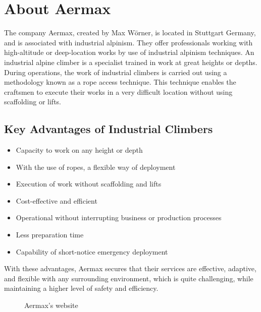 \section{About Aermax}

The company Aermax, created by Max Wörner, is located in Stuttgart Germany, and is associated with industrial alpinism. They offer professionals working with high-altitude or deep-location works by use of industrial alpinism techniques. An industrial alpine climber is a specialist trained in work at great heights or depths. During operations, the work of industrial climbers is carried out using a methodology known as a rope access technique. This technique enables the craftsmen to execute their works in a very difficult location without using scaffolding or lifts.


\subsection*{Key Advantages of Industrial Climbers}
\begin{itemize}
  \item Capacity to work on any height or depth
  \item With the use of ropes, a flexible way of deployment
  \item Execution of work without scaffolding and lifts
  \item Cost-effective and efficient
  \item Operational without interrupting business or production processes
  \item Less preparation time
  \item Capability of short-notice emergency deployment
\end{itemize}

With these advantages, Aermax secures that their services are effective, adaptive, and flexible with any surrounding environment, which is quite challenging, while maintaining a higher level of safety and efficiency.

\begin{figure}[H]
    \centering
    \caption{Aermax’s website}
    \label{fig:aermax-website}
\end{figure}

